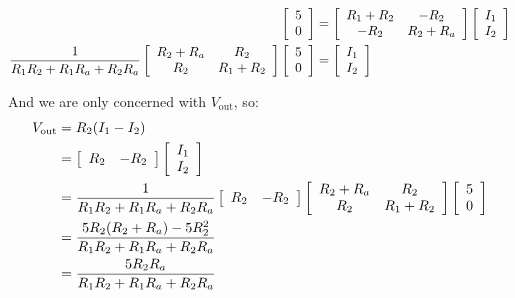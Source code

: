\documentclass{article}
\begin{document}
\begin{align}
    \left[\begin{array}{c}
        5 \\
        0
    \end{array} \right] & = \left[ \begin{array}{cc}
        R_1+R_2 & -R_2 \\
        -R_2 & R_2 + R_a \\
    \end{array}\right] \left[\begin{array}{c}
        I_1 \\
        I_2
    \end{array} \right] \notag \\
    \frac{1}{R_1R_2 + R_1R_a + R_2R_a}\left[ \begin{array}{cc}
        R_2 + R_a & R_2 \\
        R_2 & R_1+R_2 \\
    \end{array}\right] \left[\begin{array}{c}
        5 \\
        0
    \end{array} \right] & =  \left[\begin{array}{c}
        I_1 \\
        I_2
    \end{array} \right] 
\end{align}

And we are only concerned with $V_\mathrm{out}$, so:
\begin{align}
    V_\mathrm{out} & = R_2(I_1 - I_2) \\
    & = \left[\begin{array}{c c}
    R_2 & -R_2
    \end{array}\right]\left[\begin{array}{c}
        I_1 \\
        I_2
    \end{array} \right] \\
    &= \frac{1}{R_1R_2 + R_1R_a + R_2R_a} \left[\begin{array}{c c}
    R_2 & -R_2
    \end{array}\right]\left[ \begin{array}{cc}
        R_2 + R_a & R_2 \\
        R_2 & R_1+R_2 \\
    \end{array}\right] \left[\begin{array}{c}
        5 \\
        0
    \end{array} \right] \\
    &= \frac{5R_2(R_2+R_a) - 5R_2^2}{R_1R_2 + R_1R_a + R_2R_a} \\
    &= \frac{5R_2R_a}{R_1R_2 + R_1R_a + R_2R_a}
\end{align}
\end{document}
